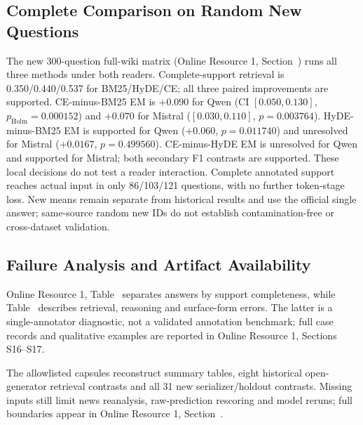 \subsection{Complete Comparison on Random New Questions}
\label{sec:followup_holdout_results}
The new 300-question full-wiki matrix (Online Resource 1, Section~) runs all three methods under both readers. Complete-support retrieval is 0.350/0.440/0.537 for BM25/HyDE/CE; all three paired improvements are supported. CE-minus-BM25 EM is $+0.090$ for Qwen (CI $[0.050,0.130]$, $p_{\mathrm{Holm}}=0.000152$) and $+0.070$ for Mistral ($[0.030,0.110]$, $p=0.003764$). HyDE-minus-BM25 EM is supported for Qwen ($+0.060$, $p=0.011740$) and unresolved for Mistral ($+0.0167$, $p=0.499560$). CE-minus-HyDE EM is unresolved for Qwen and supported for Mistral; both secondary F1 contrasts are supported. These local decisions do not test a reader interaction. Complete annotated support reaches actual input in only 86/103/121 questions, with no further token-stage loss. New means remain separate from historical results and use the official single answer; same-source random new IDs do not establish contamination-free or cross-dataset validation.

\subsection{Failure Analysis and Artifact Availability}
\label{sec:failure_analysis}

Online Resource 1, Table~ separates answers by support completeness, while Table~ describes retrieval, reasoning and surface-form errors. The latter is a single-annotator diagnostic, not a validated annotation benchmark; full case records and qualitative examples are reported in Online Resource 1, Sections S16--S17.

The allowlisted capsules reconstruct summary tables, eight historical open-generator retrieval contrasts and all 31 new serializer/holdout contrasts. Missing inputs still limit news reanalysis, raw-prediction rescoring and model reruns; full boundaries appear in Online Resource 1, Section~.
